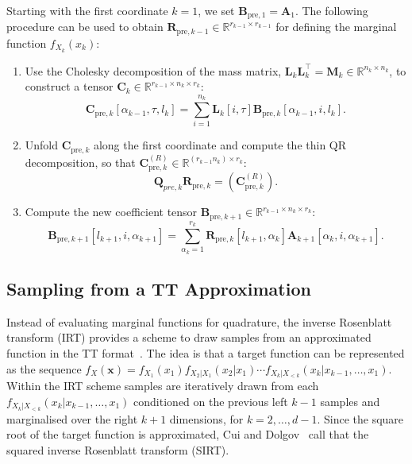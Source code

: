 \begin{prop}
	\label{prob:ForMarg}
	Starting with the first coordinate $k = 1$, we set $\bm{B}_{\text{pre},1} = \bm{A}_1$. The following procedure can be used to obtain $\bm{R}_{\text{pre},k-1} \in \mathbb{R}^{r_{k-1}  \times r_{k-1}}$ for defining the marginal function $f_{X_k}(x_k)$:
	\begin{enumerate}
		\item Use the Cholesky decomposition of the mass matrix, $\bm{L}_k \bm{L}_k^\top = \bm{M}_k \in \mathbb{R}^{n_k \times n_k}$, to construct a tensor $\bm{C}_k \in \mathbb{R}^{r_{k-1} \times n_k \times r_k}$:
		\begin{equation}
			\bm{C}_{\text{pre},k}[\alpha_{k-1}, \tau, l_k] = \sum_{i=1}^{n_k} \bm{L}_k[i, \tau] \bm{B}_{\text{pre},k}[\alpha_{k-1}, i, l_k] .\label{eq:constrCForw}
		\end{equation}
		\item Unfold $\bm{C}_{\text{pre},k}$ along the first coordinate and compute the thin QR decomposition, so that $\bm{C}_{\text{pre},k}^{(R)} \in \mathbb{R}^{(r_{k-1} n_k ) \times r_k}$:
		\begin{equation}
			\bm{Q}_{pre,k}\bm{R}_{\text{pre},k} = {(\bm{C}_{\text{pre},k}^{(R)})}.\label{eq:thinQRForw}
		\end{equation}
		\item Compute the new coefficient tensor $\bm{B}_{\text{pre}, k+1} \in \mathbb{R}^{r_{k-1} \times n_k \times r_k} $:
		\begin{equation}
			\bm{B}_{\text{pre}, k+1}[l_{k+1}, i, \alpha_{k+1}] = \sum_{\alpha_{k}=1}^{r_{k}} \bm{R}_{\text{pre},k}[l_{k+1}, \alpha_{k}] \bm{A}_{k+1}[\alpha_{k}, i, \alpha_{k+1}] .\label{eq:nextCoeffTForw}
		\end{equation}
	\end{enumerate}
\end{prop}

\clearpage
\subsection{Sampling from a TT Approximation}
\label{subsec:SamplTT}
Instead of evaluating marginal functions for quadrature, the inverse Rosenblatt transform (IRT) provides a scheme to draw samples from an approximated function in the TT format~\cite{dolgov2020approximation}.
The idea is that a target function can be represented as the sequence $ f_X(\bm{x})  =   f_{X_1}(x_1)  f_{X_2|X_1}(x_2|x_1) \cdots  f_{X_k|X_{<k}}(x_k|x_{k-1},\dots,x_1)$.
Within the IRT scheme samples are iteratively drawn from each $f_{X_k|X_{<k}}(x_k|x_{k-1},\dots,x_1)$ conditioned on the previous left $k-1$ samples and marginalised over the right $k + 1$ dimensions, for $k = 2 , \dots, d-1$.
Since the square root of the target function is approximated, Cui and Dolgov~\cite{cui2022deep} call that the squared inverse Rosenblatt transform (SIRT).

